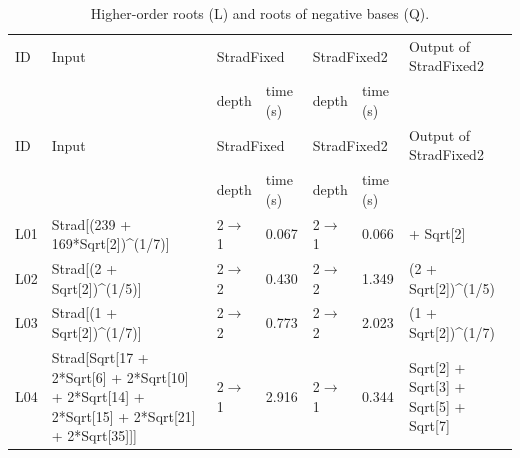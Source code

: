 \begin{longtable}{@{}p{}>{\ttfamily\footnotesize\raggedright\arraybackslash}p{}p{}p{}p{}p{}>{\ttfamily\footnotesize\raggedright\arraybackslash}p{}@{}}
\caption{Higher-order roots (L) and roots of negative bases (Q).}\label{tab:cmpLQ}\\
\toprule ID & Input & \multicolumn{2}{l}{StradFixed} & \multicolumn{2}{l}{StradFixed2} & Output of StradFixed2\\ & & depth & time (s) & depth & time (s) & \\\midrule\endfirsthead
\toprule ID & Input & \multicolumn{2}{l}{StradFixed} & \multicolumn{2}{l}{StradFixed2} & Output of StradFixed2\\ & & depth & time (s) & depth & time (s) & \\\midrule\endhead
\bottomrule\endfoot
L01 & Strad[\allowbreak{}(\allowbreak{}239 +\allowbreak{} 169*\allowbreak{}Sqrt[\allowbreak{}2]\allowbreak{})\allowbreak{}\textasciicircum{}\allowbreak{}(\allowbreak{}1/\allowbreak{}7)\allowbreak{}]\allowbreak{} & 2$\to$1 & 0.067 & 2$\to$1 & 0.066 & 1 +\allowbreak{} Sqrt[\allowbreak{}2]\allowbreak{}\\
L02 & Strad[\allowbreak{}(\allowbreak{}2 +\allowbreak{} Sqrt[\allowbreak{}2]\allowbreak{})\allowbreak{}\textasciicircum{}\allowbreak{}(\allowbreak{}1/\allowbreak{}5)\allowbreak{}]\allowbreak{} & 2$\to$2 & 0.430 & 2$\to$2 & 1.349 & (\allowbreak{}2 +\allowbreak{} Sqrt[\allowbreak{}2]\allowbreak{})\allowbreak{}\textasciicircum{}\allowbreak{}(\allowbreak{}1/\allowbreak{}5)\allowbreak{}\\
L03 & Strad[\allowbreak{}(\allowbreak{}1 +\allowbreak{} Sqrt[\allowbreak{}2]\allowbreak{})\allowbreak{}\textasciicircum{}\allowbreak{}(\allowbreak{}1/\allowbreak{}7)\allowbreak{}]\allowbreak{} & 2$\to$2 & 0.773 & 2$\to$2 & 2.023 & (\allowbreak{}1 +\allowbreak{} Sqrt[\allowbreak{}2]\allowbreak{})\allowbreak{}\textasciicircum{}\allowbreak{}(\allowbreak{}1/\allowbreak{}7)\allowbreak{}\\
L04 & Strad[\allowbreak{}Sqrt[\allowbreak{}17 +\allowbreak{} 2*\allowbreak{}Sqrt[\allowbreak{}6]\allowbreak{} +\allowbreak{} 2*\allowbreak{}Sqrt[\allowbreak{}10]\allowbreak{} +\allowbreak{} 2*\allowbreak{}Sqrt[\allowbreak{}14]\allowbreak{} +\allowbreak{} 2*\allowbreak{}Sqrt[\allowbreak{}15]\allowbreak{} +\allowbreak{} 2*\allowbreak{}Sqrt[\allowbreak{}21]\allowbreak{} +\allowbreak{} 2*\allowbreak{}Sqrt[\allowbreak{}35]\allowbreak{}]\allowbreak{}]\allowbreak{} & 2$\to$1 & 2.916 & 2$\to$1 & 0.344 & Sqrt[\allowbreak{}2]\allowbreak{} +\allowbreak{} Sqrt[\allowbreak{}3]\allowbreak{} +\allowbreak{} Sqrt[\allowbreak{}5]\allowbreak{} +\allowbreak{} Sqrt[\allowbreak{}7]\allowbreak{}\\

\end{longtable}
